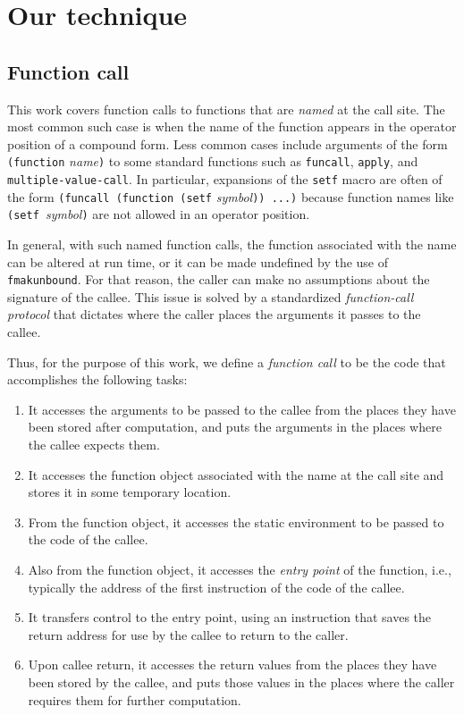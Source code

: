 \section{Our technique}
\label{sec-our-technique}

\subsection{Function call}

This work covers function calls to functions that are \emph{named} at
the call site.  The most common such case is when the name of the
function appears in the operator position of a compound form.  Less
common cases include arguments of the form \texttt{(function}
\textit{name}\texttt{)} to some standard functions such as
\texttt{funcall}, \texttt{apply}, and \texttt{multiple-value-call}.
In particular, expansions of the \texttt{setf} macro are often of the
form \texttt{(funcall (function (setf} \textit{symbol}\texttt{)) ...)}
because function names like \texttt{(setf }\textit{symbol}\texttt{)}
are not allowed in an operator position.

In general, with such named function calls, the function associated
with the name can be altered at run time, or it can be made undefined
by the use of \texttt{fmakunbound}.  For that reason, the caller can
make no assumptions about the signature of the callee.  This issue is
solved by a standardized \emph{function-call protocol} that dictates
where the caller places the arguments it passes to the callee.

Thus, for the purpose of this work, we define a \emph{function call}
to be the code that accomplishes the following tasks:

\begin{enumerate}
\item It accesses the arguments to be passed to the callee from the
  places they have been stored after computation, and puts the
  arguments in the places where the callee expects them.
\item It accesses the function object associated with the name at the
  call site and stores it in some temporary location.
\item From the function object, it accesses the static environment to
  be passed to the code of the callee.
\item Also from the function object, it accesses the \emph{entry
  point} of the function, i.e., typically the address of the first
  instruction of the code of the callee.
\item It transfers control to the entry point, using an instruction
  that saves the return address for use by the callee to return to the
  caller.
\item Upon callee return, it accesses the return values from the places
  they have been stored by the callee, and puts those values in the
  places where the caller requires them for further computation.
\end{enumerate}

